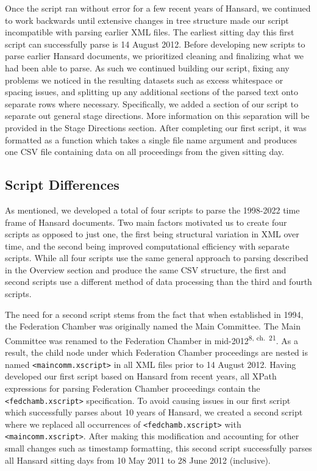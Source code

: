 \documentclass[
  letterpaper,
  DIV=11,
  numbers=noendperiod]{scrartcl}
\begin{document}
Once the script ran without error for a few recent years of Hansard, we
continued to work backwards until extensive changes in tree structure
made our script incompatible with parsing earlier XML files. The
earliest sitting day this first script can successfully parse is 14
August 2012. Before developing new scripts to parse earlier Hansard
documents, we prioritized cleaning and finalizing what we had been able
to parse. As such we continued building our script, fixing any problems
we noticed in the resulting datasets such as excess whitespace or
spacing issues, and splitting up any additional sections of the parsed
text onto separate rows where necessary. Specifically, we added a
section of our script to separate out general stage directions. More
information on this separation will be provided in the Stage Directions
section. After completing our first script, it was formatted as a
function which takes a single file name argument and produces one CSV
file containing data on all proceedings from the given sitting day.

\hypertarget{sec-diff}{%
\subsection{Script Differences}\label{sec-diff}}

As mentioned, we developed a total of four scripts to parse the
1998-2022 time frame of Hansard documents. Two main factors motivated us
to create four scripts as opposed to just one, the first being
structural variation in XML over time, and the second being improved
computational efficiency with separate scripts. While all four scripts
use the same general approach to parsing described in the Overview
section and produce the same CSV structure, the first and second scripts
use a different method of data processing than the third and fourth
scripts.

The need for a second script stems from the fact that when established
in 1994, the Federation Chamber was originally named the Main Committee.
The Main Committee was renamed to the Federation Chamber in
mid-2012\textsuperscript{8, ch.~21}. As a result, the child node under
which Federation Chamber proceedings are nested is named
\texttt{\textless{}maincomm.xscript\textgreater{}} in all XML files
prior to 14 August 2012. Having developed our first script based on
Hansard from recent years, all XPath expressions for parsing Federation
Chamber proceedings contain the
\texttt{\textless{}fedchamb.xscript\textgreater{}} specification. To
avoid causing issues in our first script which successfully parses about
10 years of Hansard, we created a second script where we replaced all
occurrences of \texttt{\textless{}fedchamb.xscript\textgreater{}} with
\texttt{\textless{}maincomm.xscript\textgreater{}}. After making this
modification and accounting for other small changes such as timestamp
formatting, this second script successfully parses all Hansard sitting
days from 10 May 2011 to 28 June 2012 (inclusive).
\end{document}
